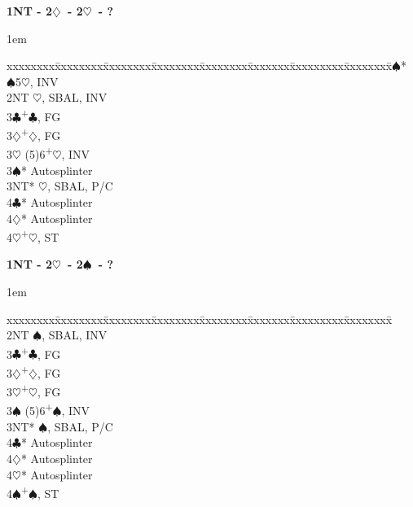 \documentclass[10pt]{article}
\renewcommand{\c}{$\clubsuit$}
\renewcommand{\d}{$\diamondsuit$}
\newcommand{\h}{$\heartsuit$}
\newcommand{\s}{$\spadesuit$}
\newcommand{\p}{\textsuperscript{+}}
\newenvironment{bidtable}[1][]
{\textbf{#1}
  \begin{adjustwidth}{1em}{}
    \addvspace{2pt}
    \begin{tabbing}
      xxxxxxxx\=xxxxxxxx\=xxxxxxxx\=xxxxxxxx\=xxxxxxxx\=xxxxxxx\=xxxxxxxxx\=xxxxxxxx\=\kill}
{\end{tabbing}\end{adjustwidth}\bigskip}%
\begin{document}
\begin{bidtable}[1NT - 2\d\ - 2\h\ - ?]
2\s* {}\s 5\h, INV   \\
2NT  \h, SBAL, INV \\
3\c  {}\p\c, FG      \\
3\d  {}\p\d, FG      \\
3\h  \> (5)6\p\h, INV  \\
3\s* \> Autosplinter   \\
3NT* \h, SBAL, P/C \\
4\c* \> Autosplinter   \\
4\d* \> Autosplinter   \\
4\h  {}\p\h, ST
\end{bidtable}

\begin{bidtable}[1NT - 2\h\ - 2\s\ - ?]
2NT  \s, SBAL, INV  \\
3\c  {}\p\c, FG      \\
3\d  {}\p\d, FG      \\
3\h  {}\p\h, FG                   \\
3\s  \> (5)6\p\s, INV   \\
3NT* \s, SBAL, P/C\\
4\c* \> Autosplinter   \\
4\d* \> Autosplinter   \\
4\h* \> Autosplinter   \\
4\s  {}\p\s, ST
\end{bidtable}



\end{document}
